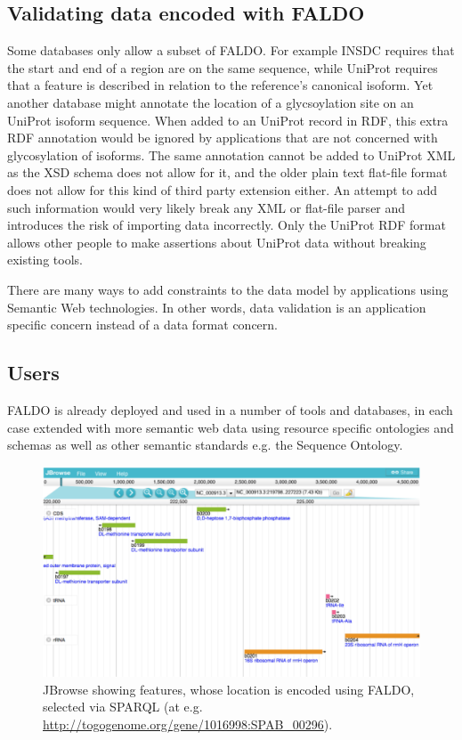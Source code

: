 \subsection*{Validating data encoded with FALDO}

Some databases only allow a subset of FALDO. 
For example INSDC requires that the start and end of a region are on the same sequence,
while UniProt requires that a feature is described in relation to the reference's canonical isoform.
Yet another database might annotate the location of a glycsoylation site on an UniProt isoform sequence.
When added to an UniProt record in RDF, this extra RDF annotation would be ignored by applications that are not concerned with glycosylation of isoforms.
The same annotation cannot be added to UniProt XML as the XSD schema does not allow for it,
and the older plain text flat-file format does not allow for this kind of third party extension either.
An attempt to add such information would very likely break any XML or flat-file parser and introduces the risk of importing data incorrectly.
Only the UniProt RDF format allows other people to make assertions about UniProt data without breaking existing tools.

There are many ways to add constraints to the data model by applications using Semantic Web technologies\cite{RDFValidationReport}.
In other words, data validation is an application specific concern instead of a data format concern.

\subsection*{Users}
FALDO is already deployed and used in a number of tools and databases, in each case extended with more semantic web data using resource specific ontologies and schemas as well as other semantic standards e.g. the Sequence Ontology.

\begin{figure}
\begin{center}
\includegraphics[width=16cm]{figures/togogenomes.pdf}
\end{center}
\caption{JBrowse showing features, whose location is encoded using FALDO, selected via SPARQL (at e.g. \protect\url{http://togogenome.org/gene/1016998:SPAB_00296}). }
\label{fig:jbrowse}
\end{figure}

